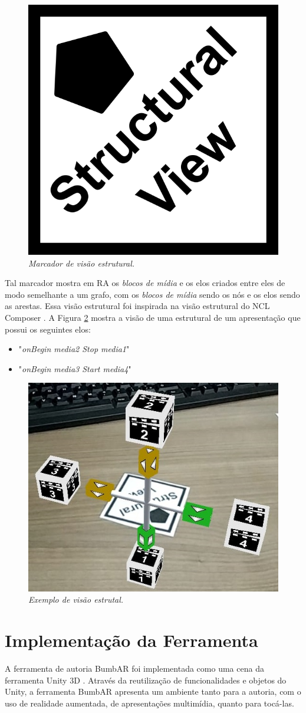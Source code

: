 \documentclass[../main.tex]{subfiles}
\begin{document}
\begin{figure}[!ht]
\centering
\includegraphics[width=0.2\linewidth]{IMG/Marcadores/estrutural_marker.png}
\caption{\textit{Marcador de visão estrutural.}}
\label{fig:estrutural_marker}
\end{figure}

Tal marcador mostra em RA os \emph{blocos de mídia} e os elos criados entre eles de modo semelhante a um grafo, com os \emph{blocos de mídia} sendo os nós e os elos sendo as arestas. Essa visão estrutural foi inspirada na visão estrutural do NCL Composer \cite{azevedo2014composer}. A Figura \ref{fig:estrutual} mostra a visão de uma estrutural de um apresentação que possui os seguintes elos:
\begin{itemize}
    \item "\emph{onBegin media2 Stop media1}"
    \item "\emph{onBegin media3 Start media4}"
\end{itemize}

\begin{figure}[!ht]
\centering
\includegraphics[width=0.45\linewidth]{IMG/estrutural.jpg}
\caption{\textit{Exemplo de visão estrutal.}}
\label{fig:estrutual}
\end{figure}

\section{Implementação da Ferramenta}
\label{sec:implementacao_prototipo}

A ferramenta de autoria BumbAR foi implementada como uma cena da ferramenta Unity 3D \cite{unity}. Através da reutilização de funcionalidades e objetos do Unity, a ferramenta BumbAR apresenta um ambiente tanto para a autoria, com o uso de realidade aumentada, de apresentações multimídia, quanto para tocá-las.
\end{document}
